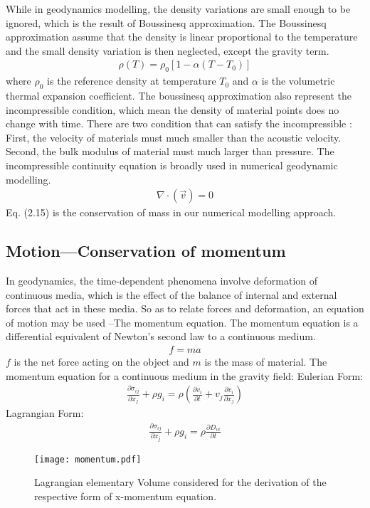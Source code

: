 While in geodynamics modelling, the density variations are small enough to be ignored, which is the result of Boussinesq approximation. The Boussinesq approximation assume that the density is linear proportional to the temperature and the small density variation is then neglected, except the gravity term.
\begin{align}
\rho (T) = \rho_0[1-\alpha (T-T_0)] 
\end{align}
where $\rho_0$ is the reference density at temperature $T_0$ and $\alpha$ is the volumetric thermal expansion coefficient. The boussinesq approximation also represent the incompressible condition, which mean the density of material points does no change with time. There are two condition that can satisfy the incompressible : First, the velocity of materials must much smaller than the acoustic velocity. Second, the bulk modulus of material must much larger than pressure. The incompressible continuity equation is broadly used in numerical geodynamic modelling. 
\begin{align}
\nabla \cdot (\vec v) = 0 
\end{align}
Eq. (2.15) is the conservation of mass in our numerical modelling approach.

\subsection{Motion---Conservation of momentum}
In geodynamics, the time-dependent phenomena involve deformation of continuous media, which is the effect of the balance of internal and external forces that act in these media. So as to relate forces and deformation, an equation of motion may be used --The momentum equation. The momentum equation is a differential equivalent of Newton’s second law to a continuous medium.
\begin{align}
f=ma
\end{align}
$f$ is the net force acting on the object and $m$ is the mass of material. The momentum equation for a continuous medium in the gravity field:
Eulerian Form:  \begin{align}
\frac{\partial \sigma_{ij}}{\partial x_j}+\rho g_i = \rho (\frac{\partial v_i}{\partial t}+v_j\frac{\partial v_i}{\partial x_j})
\end{align}
Lagrangian Form:  \begin{align}
\frac{\partial \sigma_{ij}}{\partial x_j}+\rho g_i = \rho \frac{\partial D_{vi}}{\partial t}
\end{align}
\begin{figure*}[ht!]
    \centering
    \texttt{[image: momentum.pdf]}
    \caption{ Lagrangian elementary Volume considered for the derivation of the respective form of x-momentum equation.}
    \label{fig::Lagrangian Volume}
\end{figure*}

